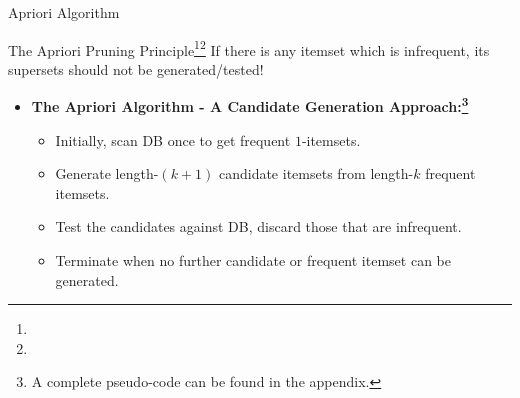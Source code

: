 \begin{frame}{Apriori Algorithm}
	\begin{block}{The Apriori Pruning Principle\footnote{}\footnote{}}
		If there is any itemset which is infrequent, its supersets should not be generated/tested!
	\end{block}

	\begin{itemize}
		\item \textbf{The Apriori Algorithm - A Candidate Generation Approach:\footnote{A complete pseudo-code can be found in the appendix.}}
		      \begin{itemize}
			      \item Initially, scan DB once to get frequent $1$-itemsets.
			      \item Generate length-$(k+1)$ candidate itemsets from length-$k$
			            frequent itemsets.
			      \item Test the candidates against DB, discard those that are
			            infrequent.
			      \item Terminate when no further candidate or frequent itemset can
			            be generated.
		      \end{itemize}
	\end{itemize}
\end{frame}

